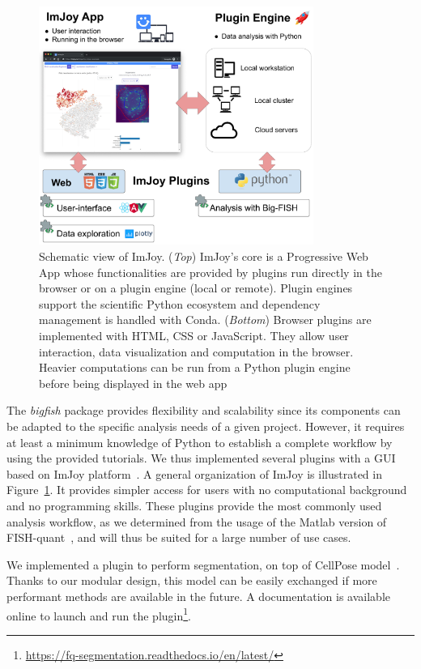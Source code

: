 \begin{figure}[h]
    \centering
    \includegraphics[width=0.8\textwidth]{figures/chapter1/schema_imjoy}
    \caption{Schematic view of ImJoy.
	(\textit{Top}) ImJoy's core is a Progressive Web App whose functionalities are provided by plugins run directly in the browser or on a plugin engine (local or remote).
	Plugin engines support the scientific Python ecosystem and dependency management is handled with Conda.
	(\textit{Bottom}) Browser plugins are implemented with HTML, CSS or JavaScript.
	They allow user interaction, data visualization and computation in the browser.
	Heavier computations can be run from a Python plugin engine before being displayed in the web app}
    \label{fig:imjoy}
\end{figure}

The \emph{bigfish} package provides flexibility and scalability since its components can be adapted to the specific analysis needs of a given project.
However, it requires at least a minimum knowledge of Python to establish a complete workflow by using the provided tutorials.
We thus implemented several plugins with a \ac{GUI} based on ImJoy platform~\cite{ouyang_imjoy_2019}.
A general organization of ImJoy is illustrated in Figure~\ref{fig:imjoy}.
It provides simpler access for users with no computational background and no programming skills.
These plugins provide the most commonly used analysis workflow, as we determined from the usage of the Matlab version of FISH-quant~\cite{mueller_fish-quant_2013}, and will thus be suited for a large number of use cases.

We implemented a plugin to perform segmentation, on top of CellPose model~\cite{stringer_cellpose_2021}.
Thanks to our modular design, this model can be easily exchanged if more performant methods are available in the future.
A documentation is available online to launch and run the plugin\footnote{\url{https://fq-segmentation.readthedocs.io/en/latest/}}.

